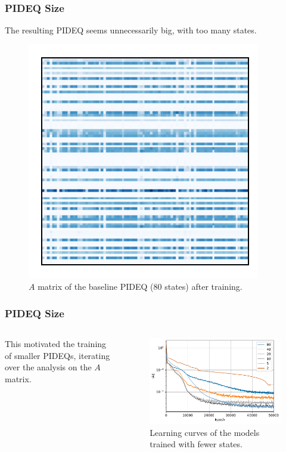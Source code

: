 \documentclass[t]{beamer}
\begin{document}
\begin{frame}
    \frametitle{PIDEQ Size}
    The resulting PIDEQ seems unnecessarily big, with too many states.
    \begin{figure}[h]
	\includegraphics[width=.4\textwidth]{../images/exp_1_matplot.pdf}
	\caption{$A$ matrix of the baseline PIDEQ (80 states) after training.}
	\label{fig:baseline-pideq-A}
    \end{figure}
\end{frame}

\begin{frame}
    \frametitle{PIDEQ Size}
    \begin{columns}[c]
    \begin{column}{.4\textwidth}
	This motivated the training of smaller PIDEQs, iterating over the analysis on the $A$ matrix.
    \end{column}
    \begin{column}{.6\textwidth}
	\begin{figure}[h]
	    \centering
	    \includegraphics[width=\textwidth]{../images/exp_2_iae.pdf}
	    \caption{Learning curves of the models trained with fewer states.}
	    \label{fig:states-iae}
	\end{figure}
    \end{column}
    \end{columns}
\end{frame}
\end{document}
